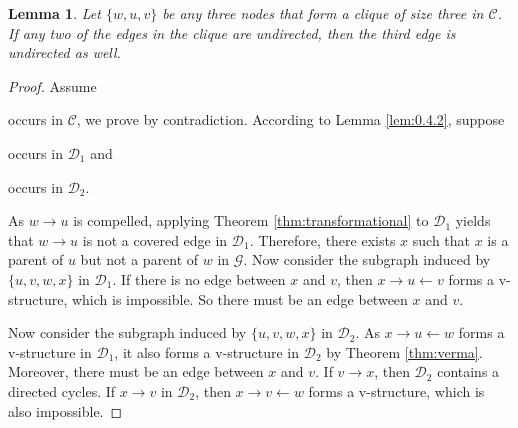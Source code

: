 \documentclass{article}
\newtheorem{lemma}{Lemma}[section]
\theoremstyle{definition}
\newcommand{\cC}{\mathcal{C}}
\newcommand{\cD}{\mathcal{D}}
\newcommand{\cG}{\mathcal{G}}
\newcommand{\<}{\left\langle}
\renewcommand{\>}{\right\rangle}
\begin{document}
\begin{lemma}\label{lem:0.4.3}
    Let $\{w, u, v\}$ be any three nodes that form a clique of size three in $\cC$. If any two of the edges in the clique are undirected, then the third edge is undirected as well.
\end{lemma}
\begin{proof}
    Assume  occurs in $\cC$, we prove by contradiction. 
      According to Lemma \ref*{lem:0.4.2}, suppose  occurs in $\cD_1$ and 
       occurs in $\cD_2$. \par
      As $w\rightarrow u$ is compelled, applying Theorem \ref{thm:transformational} to $\cD_1$ yields that $w\to u$ is not a covered edge in $\cD_1$.
      Therefore, there exists $x$ such that $x$ is a parent of $u$ but not a parent of $w$ in $\cG$. Now consider the subgraph induced by $\{u,v,w,x\}$ in $\cD_1$.
      If there is no edge between $x$ and $v$, then $x\rightarrow u \leftarrow v$ forms a v-structure, which is impossible. So there must be an edge between $x$ and $v$.\par 
      Now consider the subgraph induced by $\{u,v,w,x\}$ in $\cD_2$. As $x\rightarrow u \leftarrow w$ forms a v-structure in $\cD_1$, it also forms a v-structure in $\cD_2$ by Theorem \ref{thm:verma}. 
      Moreover, there must be an edge between $x$ and $v$. If $v\to x$, then $\cD_2$ contains a directed cycles. If $x\rightarrow v$ in $\cD_2$, then $x\rightarrow v \leftarrow w$ forms a v-structure, which is also impossible.

\end{proof}
\end{document}
